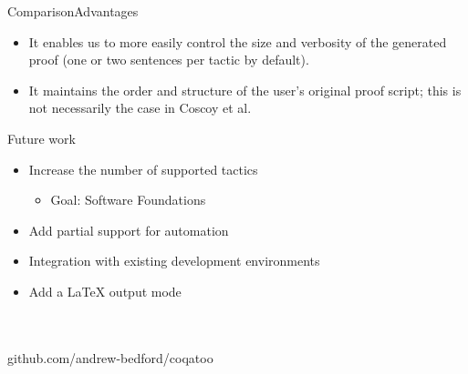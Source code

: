 \documentclass[pdf]{beamer}
\begin{document}
\begin{frame}{Comparison}{Advantages}
    \begin{itemize}
        \item{It enables us to more easily control the size and verbosity of the generated proof (one or two sentences per tactic by default).}
        \item{It maintains the order and structure of the user's original proof script; this is not necessarily the case in Coscoy et al. }
      \end{itemize}
\end{frame}

\begin{frame}{Future work}
    \begin{itemize}
        \item Increase the number of supported tactics
        \begin{itemize}
            \item Goal: Software Foundations
        \end{itemize}
        \item Add partial support for automation
        \item Integration with existing development environments
        \item Add a LaTeX output mode
    \end{itemize}
\end{frame}

\begin{frame}{}{}
    \\~\\
    github.com/andrew-bedford/coqatoo
\end{frame}
\end{document}
